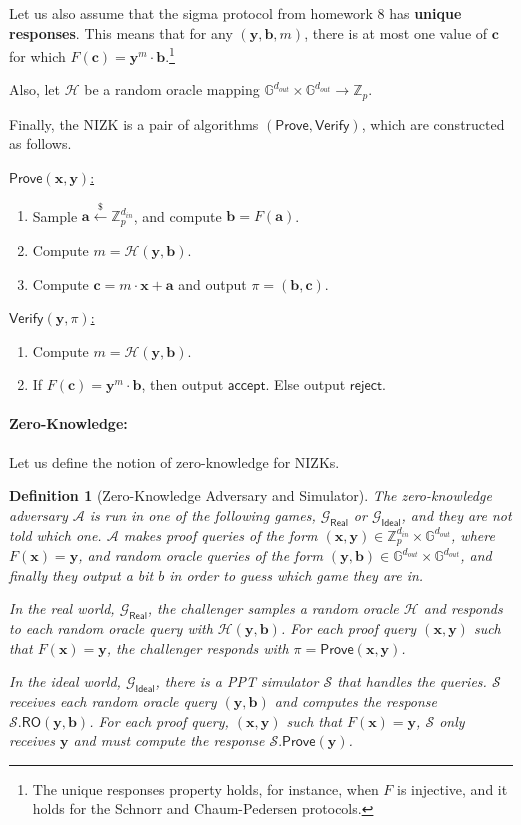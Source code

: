 \documentclass[11pt]{article}
\newtheorem{definition}[theorem]{Definition}
\numberwithin{equation}{section}
\newcommand{\bfa}{\mathbf{a}}
\newcommand{\bfb}{\mathbf{b}}
\newcommand{\bfc}{\mathbf{c}}
\newcommand{\bfx}{\mathbf{x}}
\newcommand{\bfy}{\mathbf{y}}
\newcommand{\bbG}{\mathbb{G}}
\newcommand{\bbZ}{\mathbb{Z}}
\newcommand{\cA}{\mathcal{A}}
\newcommand{\cG}{\mathcal{G}}
\newcommand{\cH}{\mathcal{H}}
\newcommand{\cS}{\mathcal{S}}
\newcommand{\Prove}{\mathsf{Prove}}
\newcommand{\Verify}{\mathsf{Verify}}
\newcommand{\RO}{\mathsf{RO}}
\newcommand{\getsr}{\stackrel{\$}{\gets}}
\begin{document}
Let us also assume that the sigma protocol from homework 8 has \textbf{unique responses}. This means that for any $(\bfy, \bfb, m)$, there is at most one value of $\bfc$ for which $F(\bfc) = \bfy^m \cdot \bfb$.\footnote{The unique responses property holds, for instance, when $F$ is injective, and it holds for the Schnorr and Chaum-Pedersen protocols.}

Also, let $\cH$ be a random oracle mapping $\bbG^{d_{out}} \times \bbG^{d_{out}} \to \bbZ_p$. 

Finally, the NIZK is a pair of algorithms $(\Prove, \Verify)$, which are constructed as follows.\newline

\noindent\underline{$\Prove(\bfx, \bfy)$:}
\begin{enumerate}
    \item Sample $\bfa \getsr \bbZ_p^{d_{in}}$, and compute $\bfb = F(\bfa)$.
    \item Compute $m = \cH(\bfy, \bfb)$.
    \item Compute $\bfc = m \cdot \bfx + \bfa$ and output $\pi = (\bfb, \bfc)$.
\end{enumerate}

\noindent\underline{$\Verify(\bfy, \pi)$:}
\begin{enumerate}
    \item Compute $m = \cH(\bfy, \bfb)$.
    \item If $F(\bfc) = \bfy^m \cdot \bfb$, then output $\mathsf{accept}$. Else output $\mathsf{reject}$.
\end{enumerate}

\paragraph{Zero-Knowledge:}
Let us define the notion of zero-knowledge for NIZKs. 

\begin{definition}[Zero-Knowledge Adversary and Simulator]
    The zero-knowledge adversary $\cA$ is run in one of the following games, $\cG_{\mathsf{Real}}$ or $\cG_{\mathsf{Ideal}}$, and they are not told which one. $\cA$ makes \textit{proof queries} of the form $(\bfx, \bfy) \in \bbZ_p^{d_{in}} \times \bbG^{d_{out}}$, where $F(\bfx) = \bfy$, and \textit{random oracle queries} of the form $(\bfy, \bfb) \in \bbG^{d_{out}} \times \bbG^{d_{out}}$, and finally they output a bit $b$ in order to guess which game they are in.
    
    In the \textit{real world}, $\cG_{\mathsf{Real}}$, the challenger samples a random oracle $\cH$ and responds to each random oracle query with $\cH(\bfy, \bfb)$. For each proof query $(\bfx, \bfy)$ such that $F(\bfx) = \bfy$, the challenger responds with $\pi = \Prove(\bfx, \bfy)$.

    In the \textit{ideal world}, $\cG_{\mathsf{Ideal}}$, there is a PPT simulator $\cS$ that handles the queries. $\cS$ receives each random oracle query $(\bfy, \bfb)$ and computes the response $\cS.\RO(\bfy, \bfb)$. For each proof query, $(\bfx, \bfy)$ such that $F(\bfx) = \bfy$, $\cS$ only receives $\bfy$ and must compute the response $\cS.\Prove(\bfy)$.
\end{definition}
\end{document}

